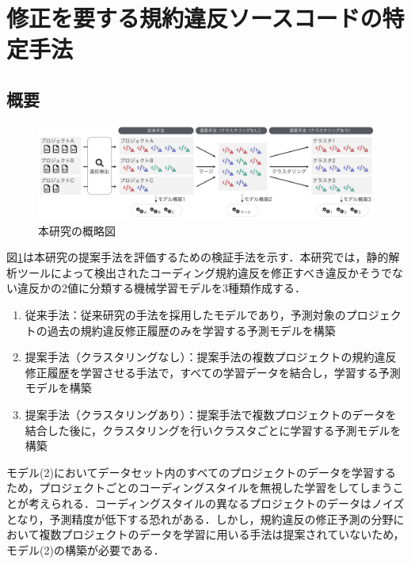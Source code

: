 \documentclass[submit,noauthor,ses,dvipdfmx]{ipsj}
\begin{document}
\section{修正を要する規約違反ソースコードの特定手法}\label{chap:approach}

\subsection{概要}

\begin{figure}[t]
	\centering
	\includegraphics[width=0.8\linewidth]{Kameoka_fig/kameoka_fig1.pdf}
	\caption{本研究の概略図}
	\label{fig:Teiannsyuhou}
\end{figure}

図\ref{fig:Teiannsyuhou}は本研究の提案手法を評価するための検証手法を示す．本研究では，静的解析ツールによって検出されたコーディング規約違反を修正すべき違反かそうでない違反かの2値に分類する機械学習モデルを3種類作成する．%

\begin{enumerate}
  \item 従来手法：従来研究の手法を採用したモデルであり，予測対象のプロジェクトの過去の規約違反修正履歴のみを学習する予測モデルを構築\cite{JyuraiPre}
  \item 提案手法（クラスタリングなし）：提案手法の複数プロジェクトの規約違反修正履歴を学習させる手法で，すべての学習データを結合し，学習する予測モデルを構築
  \item 提案手法（クラスタリングあり）：提案手法で複数プロジェクトのデータを結合した後に，クラスタリングを行いクラスタごとに学習する予測モデルを構築
\end{enumerate}

モデル(2)においてデータセット内のすべてのプロジェクトのデータを学習するため，プロジェクトごとのコーディングスタイルを無視した学習をしてしまうことが考えられる．コーディングスタイルの異なるプロジェクトのデータはノイズとなり，予測精度が低下する恐れがある．しかし，規約違反の修正予測の分野において複数プロジェクトのデータを学習に用いる手法は提案されていないため，モデル(2)の構築が必要である．
\end{document}
